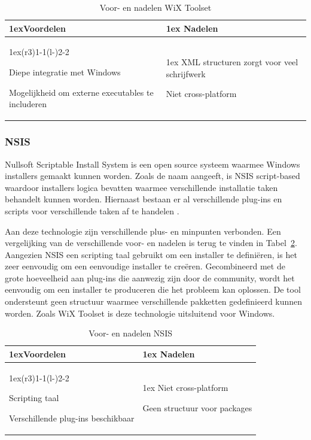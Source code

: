 \begin{table}
\begin{tabularx}{\linewidth}{>{\parskip1ex}X@{\kern4\tabcolsep}>{\parskip1ex}X}
\toprule
\hfil\bfseries Voordelen
&
\hfil\bfseries Nadelen
\\\cmidrule(r{3\tabcolsep}){1-1}\cmidrule(l{-\tabcolsep}){2-2}

Diepe integratie met Windows \par
Mogelijkheid om externe executables te includeren
&
XML structuren zorgt voor veel schrijfwerk \par
Niet cross-platform
\\\bottomrule
\end{tabularx}
\caption{Voor- en nadelen WiX Toolset}
\label{tab:wix}
\end{table}

\subsubsection{NSIS}
Nullsoft Scriptable Install System is een open source systeem waarmee Windows installers gemaakt kunnen worden.
Zoals de naam aangeeft, is NSIS script-based waardoor installers logica bevatten waarmee verschillende installatie taken  behandelt kunnen worden.
Hiernaast bestaan er al verschillende plug-ins en scripts voor verschillende taken af te handelen \citep{nsisMain}.

Aan deze technologie zijn verschillende plus- en minpunten verbonden.
Een vergelijking van de verschillende voor- en nadelen is terug te vinden in Tabel~\ref{tab:nsis}.
Aangezien NSIS een scripting taal gebruikt om een installer te definiëren, is het zeer eenvoudig om een eenvoudige installer te creëren.
Gecombineerd met de grote hoeveelheid aan plug-ins die aanwezig zijn door de community, wordt het eenvoudig om een installer te produceren die het probleem kan oplossen.
De tool ondersteunt geen structuur waarmee verschillende pakketten gedefinieerd kunnen worden.
Zoals WiX Toolset is deze technologie uitsluitend voor Windows.

\begin{table}
\begin{tabularx}{\linewidth}{>{\parskip1ex}X@{\kern4\tabcolsep}>{\parskip1ex}X}
\toprule
\hfil\bfseries Voordelen
&
\hfil\bfseries Nadelen
\\\cmidrule(r{3\tabcolsep}){1-1}\cmidrule(l{-\tabcolsep}){2-2}

Scripting taal \par
Verschillende plug-ins beschikbaar
&
Niet cross-platform\par
Geen structuur voor packages
\\\bottomrule
\end{tabularx}
\caption{Voor- en nadelen NSIS}
\label{tab:nsis}
\end{table}


